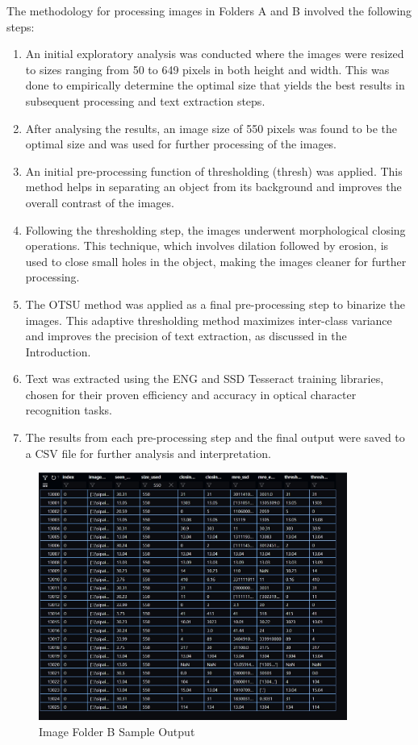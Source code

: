 The methodology for processing images in Folders A and B involved the following steps:

\begin{enumerate}
    \item An initial exploratory analysis was conducted where the images were resized to sizes ranging from 50 to 649 pixels in both height and width. This was done to empirically determine the optimal size that yields the best results in subsequent processing and text extraction steps.
    \item After analysing the results, an image size of 550 pixels was found to be the optimal size and was used for further processing of the images.
    \item An initial pre-processing function of thresholding (thresh) was applied. This method helps in separating an object from its background and improves the overall contrast of the images.
    \item Following the thresholding step, the images underwent morphological closing operations. This technique, which involves dilation followed by erosion, is used to close small holes in the object, making the images cleaner for further processing.
    \item The OTSU method was applied as a final pre-processing step to binarize the images. This adaptive thresholding method maximizes inter-class variance and improves the precision of text extraction, as discussed in the Introduction.
    \item Text was extracted using the ENG and SSD Tesseract training libraries, chosen for their proven efficiency and accuracy in optical character recognition tasks.
    \item The results from each pre-processing step and the final output were saved to a CSV file for further analysis and interpretation.

\end{enumerate}

\begin{figure}[ht]
    \centering
    \includegraphics[width=0.9\textwidth]{Figures/Methodology/sipa_03/sample_output.jpg}
    \caption[Image Folder B Sample Output]{Image Folder B Sample Output}
    \label{fig:Image Folder B Sample Output}
\end{figure}


